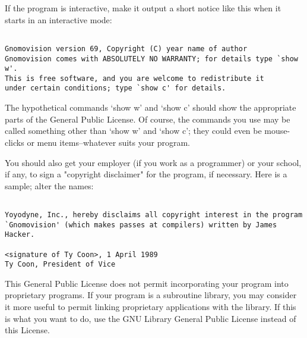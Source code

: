 If the program is interactive, make it output a short notice like this
when it starts in an interactive mode:
{\small
\begin{verbatim}

Gnomovision version 69, Copyright (C) year name of author
Gnomovision comes with ABSOLUTELY NO WARRANTY; for details type `show w'.
This is free software, and you are welcome to redistribute it
under certain conditions; type `show c' for details.
\end{verbatim}
}
The hypothetical commands `show w' and `show c' should show the appropriate
parts of the General Public License.  Of course, the commands you use may
be called something other than `show w' and `show c'; they could even be
mouse-clicks or menu items--whatever suits your program.

You should also get your employer (if you work as a programmer) or your
school, if any, to sign a "copyright disclaimer" for the program, if
necessary.  Here is a sample; alter the names:
{\small
\begin{verbatim}

Yoyodyne, Inc., hereby disclaims all copyright interest in the program
`Gnomovision' (which makes passes at compilers) written by James Hacker.

<signature of Ty Coon>, 1 April 1989
Ty Coon, President of Vice
\end{verbatim}
}
This General Public License does not permit incorporating your program into
proprietary programs.  If your program is a subroutine library, you may
consider it more useful to permit linking proprietary applications with the
library.  If this is what you want to do, use the GNU Library General
Public License instead of this License.

